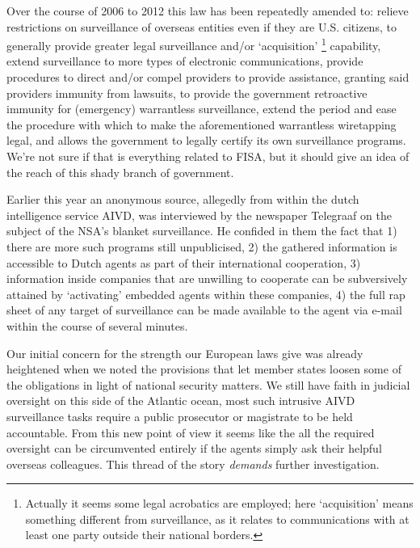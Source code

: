 \documentclass[12pt]{article}
\begin{document}
Over the course of 2006 to 2012 this law has been repeatedly amended to: relieve restrictions on surveillance of overseas entities even if they are U.S. citizens, to generally provide greater legal surveillance and/or `acquisition' \footnote{
Actually it seems some legal acrobatics are employed; here `acquisition' means something different from surveillance, as it relates to communications with at least one party outside their national borders.
}
capability, extend surveillance to more types of electronic communications, provide procedures to direct and/or compel providers to provide assistance, granting said providers immunity from lawsuits, to provide the government retroactive immunity for (emergency) warrantless surveillance, extend the period and ease the procedure with which to make the aforementioned warrantless wiretapping legal, and allows the government to legally certify its own surveillance programs.
We're not sure if that is everything related to FISA, but it should give an idea of the reach of this shady branch of government.

Earlier this year an anonymous source, allegedly from within the dutch intelligence service AIVD, was interviewed by the newspaper Telegraaf on the subject of the NSA's blanket surveillance. He confided in them the fact that 1) there are more such programs still unpublicised, 2) the gathered information is accessible to Dutch agents as part of their international cooperation, 3) information inside companies that are unwilling to cooperate can be subversively attained by `activating' embedded agents within these companies, 4) the full rap sheet of any target of surveillance can be made available to the agent via e-mail within the course of several minutes.

Our initial concern for the strength our European laws give was already heightened when we noted the provisions that let member states loosen some of the obligations in light of national security matters.
We still have faith in judicial oversight on this side of the Atlantic ocean, most such intrusive AIVD surveillance tasks require a public prosecutor or magistrate to be held accountable.
From this new point of view it seems like the all the required oversight can be circumvented entirely if the agents simply ask their helpful overseas colleagues.
This thread of the story \textit{demands} further investigation.
\end{document}
